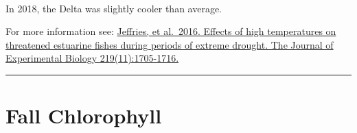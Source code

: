 \documentclass[
]{book}
\begin{document}
\begin{panel-grid}
\begin{columns-nocenter}
\begin{column800}
\end{column800}

\begin{column40}

~

\end{column40}

\begin{column800}

In 2018, the Delta was slightly cooler than average.

\end{column800}

\end{columns-nocenter}

\end{panel-grid}

\begin{disclaimer}
For more information see:
\href{https://jeb.biologists.org/content/219/11/1705.short}{Jeffries, et
al.~2016. Effects of high temperatures on threatened estuarine fishes
during periods of extreme drought. The Journal of Experimental Biology
219(11):1705-1716.}
\end{disclaimer}

\begin{center}\rule{0.5\linewidth}{0.5pt}\end{center}

\hypertarget{fall-chlorophyll}{%
\section{Fall Chlorophyll}\label{fall-chlorophyll}}
\end{document}
